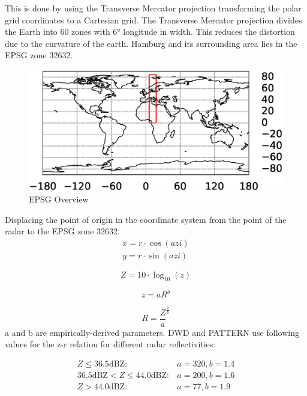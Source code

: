 \documentclass[11pt,twoside,a4paper,fleqn]{report}
\numberwithin{equation}{chapter}
\numberwithin{figure}{chapter}
\numberwithin{table}{chapter}
\begin{document}
This is done by using the Transverse Mercator projection transforming the polar grid coordinates to a Cartesian grid. The Transverse Mercator projection divides the Earth into 60 zones with  6° longitude in width. This reduces the distortion due to the curvature of the earth. Hamburg and its surrounding area lies in the EPSG zone 32632. 

\begin{figure}
	\centering
	\includegraphics[width=\textwidth]{EPSG2.eps}
	\caption{EPSG Overview}
\end{figure}

Displacing the point of origin in the coordinate system from the point of the radar to the EPSG zone 32632.
\begin{equation}
	\begin{array}{lcl}
		x = r \cdot \cos(azi)\\
		y = r \cdot \sin(azi)
	\end{array}	
\end{equation}

\begin{equation}
	Z  = 10 \cdot \log _{10}(z)
\end{equation}

\begin{equation}
	z = aR^{b}
\end{equation}

\begin{equation}
	R = \frac{Z}{a}^{\frac{1}{b}}
\end{equation}
a and b are empirically-derived parameters. DWD and PATTERN use following values for the z-r relation for different radar reflectivities:

\begin{equation}
	\begin{array}{lcl}
		Z \le 36.5 \text{dBZ}: & a = 320, b = 1.4 \\
		36.5 \text{dBZ} < Z \le 44.0 \text{dBZ}: & a  = 200, b = 1.6 \\
		Z > 44.0 \text{dBZ}: & a = 77, b = 1.9
	\end{array}
\end{equation}
\end{document}
